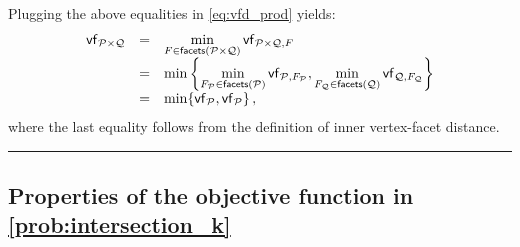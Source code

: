 \documentclass[twoside]{article}
\newcommand{\jmlrBlackBox}{\rule{1.5ex}{1.5ex}}
\newcommand{\jmlrQED}{\hfill\jmlrBlackBox\par\bigskip}
\providecommand{\proofname}{Proof}
\renewenvironment{proof}{\par\noindent{\bfseries\upshape \proofname\ }}{\jmlrQED}
\newcommand{\mP}{\mathcal{P}}
\newcommand{\mQ}{\mathcal{Q}}
\newcommand{\facets}[1]{\mathsf{facets}\left(#1\right)}
\DeclarePairedDelimiter\ceil{\lceil}{\rceil}
\DeclarePairedDelimiter\floor{\lfloor}{\rfloor}
\begin{document}
\begin{proof}
Plugging the above equalities in \cref{eq:vfd_prod} yields:
\[
\begin{array}{rcl}
\vf{\mP \times \mQ} &=& \displaystyle\min_{F \in \facets{\mP \times \mQ}} \vf{\mP \times \mQ, F}\\
&=& \min \left\{\displaystyle \min_{F_\mP \in \facets{\mP}} \vf{\mP, F_\mP}, \min_{F_\mQ \in \facets{\mQ}} \vf{\mQ, F_\mQ}\right\}\\
&=& \min\{\vf{\mP}, \vf{\mP}\}\,,
\end{array}
\]
where the last equality follows from the definition of inner vertex-facet distance.
\end{proof}





\subsection{Properties of the objective function in \cref{prob:intersection_k}}\label{a:obj}
\end{document}
